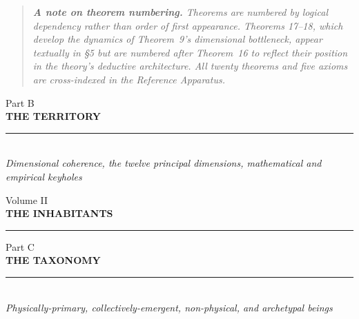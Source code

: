 \documentclass[11pt,letterpaper,openany]{book}
\begin{document}
\vspace{0.5cm}
\begin{quote}
\small\itshape\color{notegray}
\textbf{A note on theorem numbering.}\enspace
Theorems are numbered by logical dependency rather than order of first appearance.
Theorems 17--18, which develop the dynamics of Theorem~9's dimensional bottleneck,
appear textually in \S5 but are numbered after Theorem~16 to reflect their position
in the theory's deductive architecture. All twenty theorems and five axioms are
cross-indexed in the Reference Apparatus.
\end{quote}
\vspace{0.3cm}





\clearpage
\thispagestyle{empty}
\vspace*{5cm}
\begin{center}
{\large\sffamily\color{partgray}Part B}\\[0.5cm]
{\Huge\sffamily\bfseries\color{headerblue} THE TERRITORY}\\[0.5cm]
{\color{rulegray}\rule{5cm}{0.3pt}}\\[1cm]
{\normalsize\itshape\color{partgray}Dimensional coherence, the twelve principal dimensions, mathematical and empirical keyholes}
\end{center}
\clearpage
{}





\clearpage
\thispagestyle{empty}
\vspace*{4cm}
\begin{center}
{\large\sffamily\color{partgray}Volume II}\\[0.8cm]
{\fontsize{28}{34}\selectfont\sffamily\bfseries\color{headerblue} THE INHABITANTS}\\[1cm]
{\color{rulegray}\rule{6cm}{0.4pt}}
\end{center}
\clearpage


\clearpage
\thispagestyle{empty}
\vspace*{5cm}
\begin{center}
{\large\sffamily\color{partgray}Part C}\\[0.5cm]
{\Huge\sffamily\bfseries\color{headerblue} THE TAXONOMY}\\[0.5cm]
{\color{rulegray}\rule{5cm}{0.3pt}}\\[1cm]
{\normalsize\itshape\color{partgray}Physically-primary, collectively-emergent, non-physical, and archetypal beings}
\end{center}
\clearpage
{}
\end{document}
